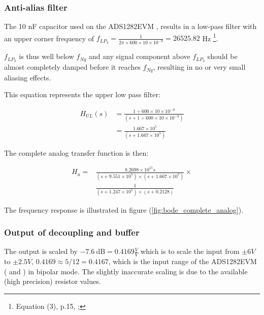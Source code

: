 \documentclass[a4paper]{article}
\begin{document}
  \begin{multicols}{2}

\subsubsection{Anti-alias filter}
The 10 nF capacitor used on the ADS1282EVM
\cite{ads1282evm_ds}, results in a low-pass filter with an upper corner frequency of $f_{LP_3} =
\frac{1}{2 \pi \times 600 \times 10 \times 10^{-9}} = 26525.82 $ Hz
\footnote{Equation (3), p.15, \cite{ads1282_ds}; }.

$f_{LP_3}$ is thus well below $f_{Nq}$ and any signal component above $f_{LP_3}$ should
be almost completely damped before it reaches $f_{Nq}$, resulting in no
or very small aliasing effects.

This equation represents the upper low pass filter:
\begin{center}
\begin{equation}
  \begin{aligned}
  H_{UL}(s) &= \frac{1 \div 600 \times 10 \times 10^{-9}}
                   {(s + 1 \div 600 \times 10 \times 10^{-9})} \\
            &= \frac{1.667 \times 10^5}{(s + 1.667 \times 10^5)}
  \end{aligned}
  \label{eqn:transfer_upper_lowpass}
\end{equation}
\end{center}

The complete analog transfer function is then:
\begin{center}
\begin{equation}
  \begin{aligned}
  H_{a} = &\frac{8.2698 \times 10^{15} s}
                { (s + 9.551 \times 10^5) \times
                   (s + 1.667 \times 10^5)
                 } \times \\
          & \frac{1}
                 {(s + 1.247 \times 10^5) \times
                  (s + 0.2128) }
  \end{aligned}
  \label{eqn:transfer_analog}
\end{equation}
\end{center}


The frequency response is illustrated in figure
(\ref{fig:bode_complete_analog}).
\subsubsection{Output of decoupling and buffer} The output is scaled by $-7.6\ \text{dB} =
0.4169 \frac{V}{V}$ which is to scale the input from $\pm 6V$ to $\pm 2.5V$, $0.4169
\approx 5 / 12 = 0.4167$, which is the input range of the ADS1282EVM
(\cite{ads1282evm_ds} and \cite{ads1282_ds}) in bipolar mode. The
slightly inaccurate scaling is due to the available (high precision) resistor values.


\end{multicols}
\end{document}
